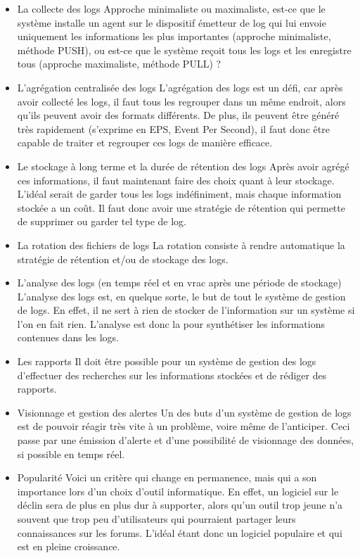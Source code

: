 \documentclass[paper=a4, fontsize=11pt]{scrartcl}
\begin{document}
\begin{itemize}\itemsep0pt \parskip0pt 
\item La collecte des logs
\subitem Approche minimaliste ou maximaliste, est-ce que le système installe un agent sur le dispositif émetteur de log qui lui envoie uniquement les informations les plus importantes (approche minimaliste, méthode PUSH), ou est-ce que le système reçoit tous les logs et les enregistre tous (approche maximaliste, méthode PULL) ?\\
\item L'agrégation centralisée des logs
\subitem L'agrégation des logs est un défi, car après avoir collecté les logs, il faut tous les regrouper dans un même endroit, alors qu'ils peuvent avoir des formats différents. De plus, ils peuvent être généré très rapidement (s'exprime en EPS, Event Per Second), il faut donc être capable de traiter et regrouper ces logs de manière efficace.\\
\item Le stockage à long terme et la durée de rétention des logs
\subitem Après avoir agrégé ces informations, il faut maintenant faire des choix quant à leur stockage. L'idéal serait de garder tous les logs indéfiniment, mais chaque information stockée a un coût. Il faut donc avoir une stratégie de rétention qui permette de supprimer ou garder tel type de log.\\
\item La rotation des fichiers de logs
\subitem La rotation consiste à rendre automatique la stratégie de rétention et/ou de stockage des logs.\\
\item L'analyse des logs (en temps réel et en vrac après une période de stockage)
\subitem L'analyse des logs est, en quelque sorte, le but de tout le système de gestion de logs. En effet, il ne sert à rien de stocker de l'information sur un système si l'on en fait rien. L'analyse est donc la pour synthétiser les informations contenues dans les logs.\\
\item Les rapports
\subitem Il doit être possible pour un système de gestion des logs d'effectuer des recherches sur les informations stockées et de rédiger des rapports.\\
\item Visionnage et gestion des alertes
\subitem Un des buts d'un système de gestion de logs est de pouvoir réagir très vite à un problème, voire même de l'anticiper. Ceci passe par une émission d'alerte et d'une possibilité de visionnage des données, si possible en temps réel.\\
\item Popularité
\subitem Voici un critère qui change en permanence, mais qui a son importance lors d'un choix d'outil informatique. En effet, un logiciel sur le déclin sera de plus en plus dur à supporter, alors qu'un outil trop jeune n'a souvent que trop peu d'utilisateurs qui pourraient partager leurs connaissances sur les forums. L'idéal étant donc un logiciel populaire et qui est en pleine croissance.
\end{itemize}
\end{document}
